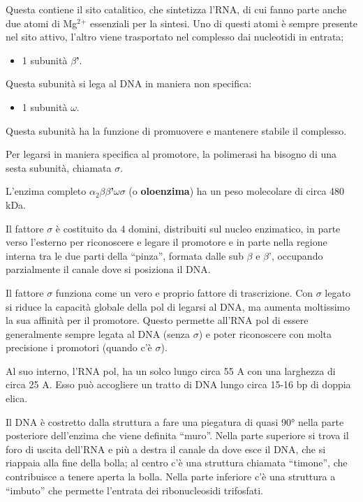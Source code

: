 \documentclass[11pt]{book}
\begin{document}
Questa contiene il sito catalitico, che sintetizza l'RNA, di cui fanno
parte anche due atomi di Mg\(^2\)\(^+\) essenziali per la sintesi. Uno
di questi atomi è sempre presente nel sito attivo, l'altro viene
trasportato nel complesso dai nucleotidi in entrata;

\begin{itemize}
\itemsep1pt\parskip0pt
\item
  1 subunità \textbf{\(\beta\)'}.
\end{itemize}

Questa subunità si lega al DNA in maniera non specifica:

\begin{itemize}
\itemsep1pt\parskip0pt
\item
  1 subunità \textbf{\(\omega\)}.
\end{itemize}

Questa subunità ha la funzione di promuovere e mantenere stabile il
complesso.

Per legarsi in maniera specifica al promotore, la polimerasi ha bisogno
di una sesta subunità, chiamata \textbf{\(\sigma\)}.

L'enzima completo
\textbf{\(\alpha\)\(_2\)\(\beta\)\(\beta\)'\(\omega\)\(\sigma\)} (o
\textbf{oloenzima}) ha un peso molecolare di circa 480 kDa.

Il fattore \(\sigma\) è costituito da 4 domini, distribuiti sul nucleo
enzimatico, in parte verso l'esterno per riconoscere e legare il
promotore e in parte nella regione interna tra le due parti della
``pinza'', formata dalle sub \(\beta\) e \(\beta\)', occupando
parzialmente il canale dove si posiziona il DNA.

Il fattore \(\sigma\) funziona come un vero e proprio fattore di
trascrizione. Con \(\sigma\) legato si riduce la capacità globale della
pol di legarsi al DNA, ma aumenta moltissimo la sua affinità per il
promotore. Questo permette all'RNA pol di essere generalmente sempre
legata al DNA (senza \(\sigma\)) e poter riconoscere con molta
precisione i promotori (quando c'è \(\sigma\)).

Al suo interno, l'RNA pol, ha un solco lungo circa 55 A con una
larghezza di circa 25 A. Esso può accogliere un tratto di DNA lungo
circa 15-16 bp di doppia elica.

Il DNA è costretto dalla struttura a fare una piegatura di quasi 90°
nella parte posteriore dell'enzima che viene definita ``muro''. Nella
parte superiore si trova il foro di uscita dell'RNA e più a destra il
canale da dove esce il DNA, che si riappaia alla fine della bolla; al
centro c'è una struttura chiamata ``timone'', che contribuisce a tenere
aperta la bolla. Nella parte inferiore c'è una struttura a ``imbuto''
che permette l'entrata dei ribonucleosidi trifosfati.
\end{document}
